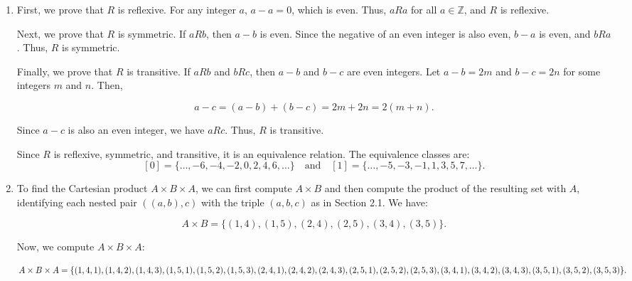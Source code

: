 \begin{enumerate}
\item
First, we prove that $R$ is reflexive. For any integer $a$, $a - a = 0$, which is even. Thus, $aRa$ for all $a \in \mathbb{Z}$, and $R$ is reflexive.

Next, we prove that $R$ is symmetric. If $aRb$, then $a - b$ is even. Since the negative of an even integer is also even, $b - a$ is even, and $bRa$. Thus, $R$ is symmetric.


Finally, we prove that $R$ is transitive. If $aRb$ and $bRc$, then $a - b$ and $b - c$ are even integers. Let $a - b = 2m$ and $b - c = 2n$ for some integers $m$ and $n$. Then,

\[
a - c = (a - b) + (b - c) = 2m + 2n = 2(m + n).
\]

Since $a - c$ is also an even integer, we have $aRc$. Thus, $R$ is transitive.

Since $R$ is reflexive, symmetric, and transitive, it is an equivalence relation. The equivalence classes are:
\[
[0] = \{\dots, -6, -4, -2, 0, 2, 4, 6, \dots\} \quad \text{and} \quad [1] = \{\dots, -5, -3, -1, 1, 3, 5, 7, \dots\}.
\]

\item
To find the Cartesian product $A \times B \times A$, we can first compute $A \times B$ and then compute the product of the resulting set with $A$, identifying each nested pair $((a,b),c)$ with the triple $(a,b,c)$ as in Section 2.1. We have:

\[
A \times B = \{(1, 4), (1, 5), (2, 4), (2, 5), (3, 4), (3, 5)\}.
\]

Now, we compute $A \times B \times A$:

\[
A \times B \times A = \{(1, 4, 1), (1, 4, 2), (1, 4, 3), (1, 5, 1), (1, 5, 2), (1, 5, 3), \\
(2, 4, 1), (2, 4, 2), (2, 4, 3), (2, 5, 1), (2, 5, 2), (2, 5, 3), \\
(3, 4, 1), (3, 4, 2), (3, 4, 3), (3, 5, 1), (3, 5, 2), (3, 5, 3)\}.
\]
\end{enumerate}

